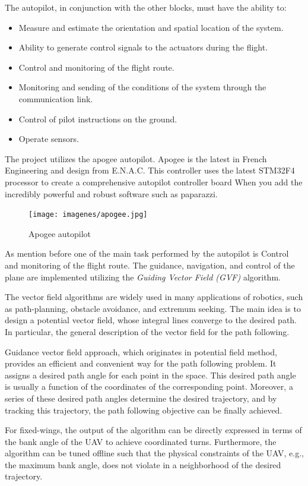 The autopilot, in conjunction with the other blocks, must have the ability to:
\begin{itemize}
    \item Measure and estimate the orientation and spatial location of the system.
    \item Ability to generate control signals to the actuators during the flight.
    \item Control and monitoring of the flight route.
    \item Monitoring and sending of the conditions of the system through the communication link.
    \item Control of pilot instructions on the ground.
    \item Operate sensors.
\end{itemize}

The project utilizes the apogee autopilot. Apogee is the latest in French Engineering and design from E.N.A.C.  This controller uses the latest STM32F4 processor to create a comprehensive autopilot controller board  When you add the incredibly powerful and robust software such as paparazzi.\cite{apogee}
\begin{figure}[H]
\centering
\texttt{[image: imagenes/apogee.jpg]}
\caption{Apogee autopilot}
\label{fig:apogee}
\end{figure}
As mention before one of the main task performed by the autopilot is Control and monitoring of the flight route. The guidance, navigation, and control of the plane are implemented utilizing the \textit{Guiding Vector Field (GVF)} algorithm. 

The vector field algorithms are widely used in many applications of robotics, such as path-planning, obstacle avoidance, and extremum seeking. The main idea is to design a potential vector field, whose integral lines converge to the desired path. In particular, the general description of the vector field for the path following.\cite{GVF}

Guidance vector field approach, which originates in potential field method, provides an efficient and convenient way for the path following problem. It assigns a desired path angle for each point in the space. This desired path angle is usually a function of the coordinates of the corresponding point. Moreover, a series of these desired path angles determine the desired trajectory, and by tracking this trajectory, the path following objective can be finally achieved.\cite{7170894}

For fixed-wings, the output of the algorithm can be directly expressed in terms of the bank angle of the UAV to achieve coordinated turns. Furthermore, the algorithm can be tuned offline such that the physical constraints of the UAV, e.g., the maximum bank angle, does not violate in a neighborhood of the desired trajectory.\cite{7942030}

